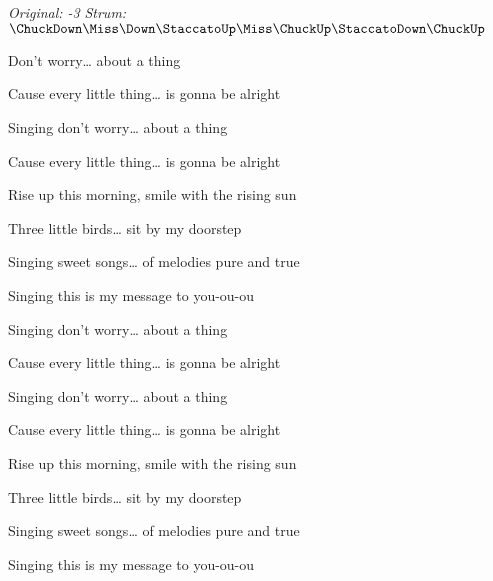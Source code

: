 \begin{song}


\begin{headerbox}
\textit{Original: -3} \quad
\textit{Strum:} $\ChuckDown\Miss\Down\StaccatoUp\Miss\ChuckUp\StaccatoDown\ChuckUp$
\end{headerbox}

\begin{vchordbox}
\end{vchordbox}

\Large

\bigskip

Don't worry… about a thing \par
Cause every little thing… is gonna be alright \par
Singing don't worry… about a thing \par
Cause every little thing… is gonna be alright \par

\bigskip

Rise up this morning, smile with the rising sun \par
Three little birds… sit by my doorstep \par
Singing sweet songs… of melodies pure and true \par
Singing  this is my message to you-ou-ou \par

\bigskip

Singing don't worry… about a thing \par
Cause every little thing… is gonna be alright \par
Singing don't worry… about a thing \par
Cause every little thing… is gonna be alright \par

\bigskip

Rise up this morning, smile with the rising sun \par
Three little birds… sit by my doorstep \par
Singing sweet songs… of melodies pure and true \par
Singing  this is my message to you-ou-ou \par


\end{song}
